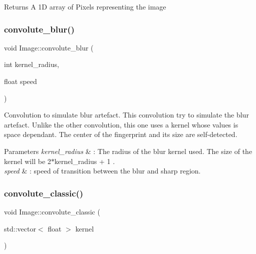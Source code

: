 \begin{DoxyReturn}{Returns}
A 1D array of Pixels representing the image 
\end{DoxyReturn}
\mbox{\label{class_image_aba2973253b0bad7456c5434589cd79d3}} 
\subsubsection{\texorpdfstring{convolute\+\_\+blur()}{convolute\_blur()}}
{\footnotesize\ttfamily void Image\+::convolute\+\_\+blur (\begin{DoxyParamCaption}\item[{int}]{kernel\+\_\+radius,  }\item[{float}]{speed }\end{DoxyParamCaption})}



Convolution to simulate blur artefact. This convolution try to simulate the blur artefact. Unlike the other convolution, this one uses a kernel whose values is space dependant. The center of the fingerprint and its size are self-\/detected. 


\begin{DoxyParams}{Parameters}
{\em kernel\+\_\+radius} & \+: The radius of the blur kernel used. The size of the kernel will be 2$\ast$kernel\+\_\+radius + 1 . \\
\hline
{\em speed} & \+: speed of transition between the blur and sharp region. \\
\hline
\end{DoxyParams}
\mbox{\label{class_image_a470150ab0e07a2edd2bd15523ec72543}} 
\subsubsection{\texorpdfstring{convolute\+\_\+classic()}{convolute\_classic()}}
{\footnotesize\ttfamily void Image\+::convolute\+\_\+classic (\begin{DoxyParamCaption}\item[{std\+::vector$<$ float $>$}]{kernel }\end{DoxyParamCaption})}



